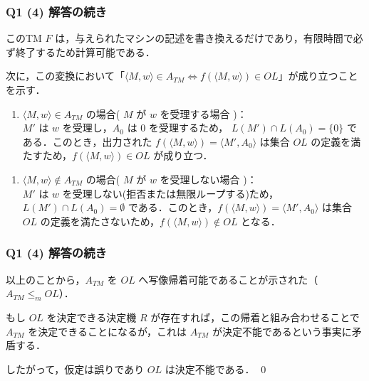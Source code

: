 \begin{frame}[fragile]
\frametitle{Q1 (4) 解答の続き}

このTM $F$ は，与えられたマシンの記述を書き換えるだけであり，有限時間で必ず終了するため計算可能である．

次に，この変換において「$\langle M, w \rangle \in A_{TM} \Leftrightarrow f(\langle M, w \rangle) \in OL$」が成り立つことを示す．

\begin{enumerate}
  \item[・] $\langle M, w \rangle \in A_{TM}$ の場合( $M$ が $w$ を受理する場合 )： \\
$M'$ は $w$ を受理し，$A_0$ は $0$ を受理するため， $L(M') \cap L(A_0) = \{0\}$ である．このとき，出力された $f(\langle M, w \rangle) = \langle M', A_0 \rangle$ は集合 $OL$ の定義を満たすため，$f(\langle M, w \rangle) \in OL$ が成り立つ．
\end{enumerate}

\begin{enumerate}
  \item[・] $\langle M, w \rangle \notin A_{TM}$ の場合( $M$ が $w$ を受理しない場合 )： \\
$M'$ は $w$ を受理しない(拒否または無限ループする)ため， $L(M') \cap L(A_0) = \emptyset$ である．このとき，$f(\langle M, w \rangle) = \langle M', A_0 \rangle$ は集合 $OL$ の定義を満たさないため，$f(\langle M, w \rangle) \notin OL$ となる．
\end{enumerate}

\end{frame}



\begin{frame}[fragile]
\frametitle{Q1 (4) 解答の続き}

以上のことから，$A_{TM}$ を $OL$ へ写像帰着可能であることが示された（$A_{TM} \le_{m} OL$）．

もし $OL$ を決定できる決定機 $R$ が存在すれば，この帰着と組み合わせることで $A_{TM}$ を決定できることになるが，これは $A_{TM}$ が決定不能であるという事実に矛盾する．

したがって，仮定は誤りであり $OL$ は決定不能である．
\hfill \qed

\end{frame}
